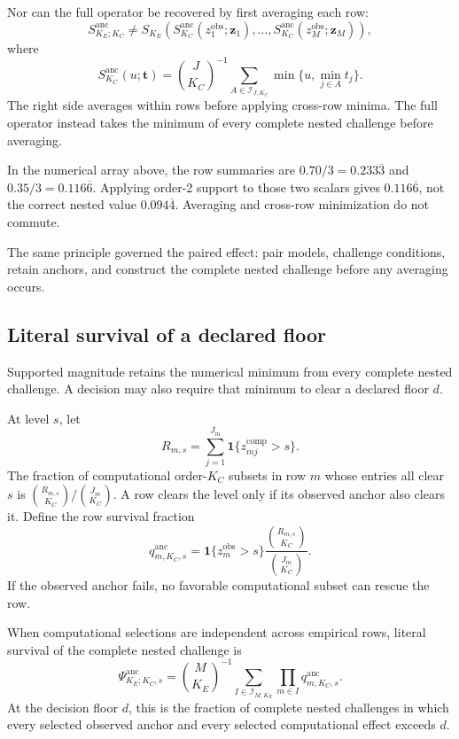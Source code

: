 \documentclass[11pt]{article}
\newcommand{\Sanc}{S^{\mathrm{anc}}}
\newcommand{\Psianc}{\Psi^{\mathrm{anc}}}
\theoremstyle{remark}
\begin{document}
Nor can the full operator be recovered by first averaging each row:
\begin{equation}
\Sanc_{K_E;K_C}
\ne
S_{K_E}\!\left(
\Sanc_{K_C}(z_1^{\mathrm{obs}};\mathbf z_1),
\ldots,
\Sanc_{K_C}(z_M^{\mathrm{obs}};\mathbf z_M)
\right),
\label{eq:row-noncomposition}
\end{equation}
where
\[
\Sanc_{K_C}(u;\mathbf t)
=
\binom{J}{K_C}^{-1}
\sum_{A\in\mathcal I_{J,K_C}}
\min\{u,\min_{j\in A}t_j\}.
\]
The right side averages within rows before applying cross-row minima. The full
operator instead takes the minimum of every complete nested challenge before
averaging.

In the numerical array above, the row summaries are
$0.70/3=0.233\overline3$ and $0.35/3=0.116\overline6$. Applying order-2
support to those two scalars gives $0.116\overline6$, not the correct nested
value $0.094\overline4$. Averaging and cross-row minimization do not commute.

The same principle governed the paired effect: pair models, challenge
conditions, retain anchors, and construct the complete nested challenge before
any averaging occurs.

\subsection{Literal survival of a declared floor}

Supported magnitude retains the numerical minimum from every complete nested
challenge. A decision may also require that minimum to clear a declared floor
$d$.

At level $s$, let
\[
R_{m,s}
=
\sum_{j=1}^{J_m}
\mathbf 1\{z_{mj}^{\mathrm{comp}}>s\}.
\]
The fraction of computational order-$K_C$ subsets in row $m$ whose entries all
clear $s$ is
$\binom{R_{m,s}}{K_C}/\binom{J_m}{K_C}$. A row clears the level only if its
observed anchor also clears it. Define the row survival fraction
\begin{equation}
q^{\mathrm{anc}}_{m,K_C,s}
=
\mathbf 1\{z_m^{\mathrm{obs}}>s\}
\frac{\binom{R_{m,s}}{K_C}}
{\binom{J_m}{K_C}}.
\label{eq:row-survival}
\end{equation}
If the observed anchor fails, no favorable computational subset can rescue the
row.

When computational selections are independent across empirical rows, literal
survival of the complete nested challenge is
\begin{equation}
\Psianc_{K_E;K_C,s}
=
\binom{M}{K_E}^{-1}
\sum_{I\in\mathcal I_{M,K_E}}
\prod_{m\in I}q^{\mathrm{anc}}_{m,K_C,s}.
\label{eq:anchored-survival}
\end{equation}
At the decision floor $d$, this is the fraction of complete nested challenges
in which every selected observed anchor and every selected computational
effect exceeds $d$.
\end{document}
